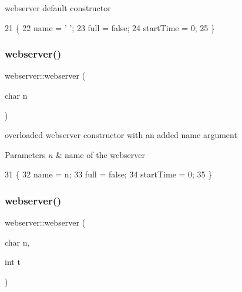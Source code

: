 webserver default constructor 
\begin{DoxyCode}
21                     \{
22             name = \textcolor{charliteral}{' '};
23             full = \textcolor{keyword}{false};
24             startTime = 0;
25         \}
\end{DoxyCode}
\mbox{\label{classwebserver_a31eed476ee2971a92e877923ea7c97fc}} 
\subsubsection{\texorpdfstring{webserver()}{webserver()}\hspace{0.1cm}{\footnotesize\ttfamily [2/3]}}
{\footnotesize\ttfamily webserver\+::webserver (\begin{DoxyParamCaption}\item[{char}]{n }\end{DoxyParamCaption})\hspace{0.3cm}{\ttfamily [inline]}}

overloaded webserver constructor with an added name argument 
\begin{DoxyParams}{Parameters}
{\em n} & name of the webserver \\
\hline
\end{DoxyParams}

\begin{DoxyCode}
31                           \{
32             name = n;
33             full = \textcolor{keyword}{false};
34             startTime = 0;
35         \}
\end{DoxyCode}
\mbox{\label{classwebserver_abf14dc8da82c8ba9277a25a18aaabaef}} 
\subsubsection{\texorpdfstring{webserver()}{webserver()}\hspace{0.1cm}{\footnotesize\ttfamily [3/3]}}
{\footnotesize\ttfamily webserver\+::webserver (\begin{DoxyParamCaption}\item[{char}]{n,  }\item[{int}]{t }\end{DoxyParamCaption})\hspace{0.3cm}{\ttfamily [inline]}}

